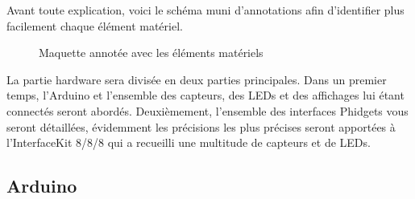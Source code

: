 Avant toute explication, voici le schéma muni d’annotations afin d’identifier plus facilement chaque élément matériel.\\

\begin{figure}[H]
    \begin{center}

        \caption{Maquette annotée avec les éléments matériels}
    \end{center}
\end{figure}

La partie hardware sera divisée en deux parties principales. Dans un premier temps, l’Arduino et l’ensemble des capteurs, des LEDs et des affichages lui étant connectés seront abordés. Deuxièmement, l’ensemble des interfaces Phidgets vous seront détaillées, évidemment les précisions les plus précises seront apportées à l’InterfaceKit 8/8/8 qui a recueilli une multitude de capteurs et de LEDs.\\

\subsection{Arduino}
